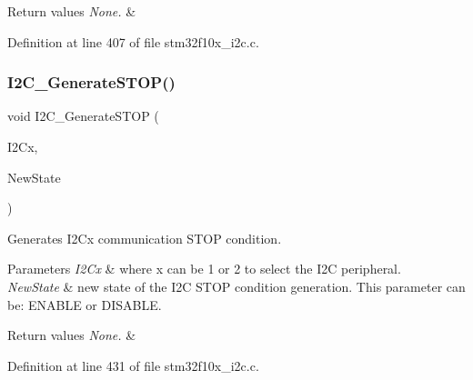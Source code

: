\begin{DoxyRetVals}{Return values}
{\em None.} & \\
\hline
\end{DoxyRetVals}


Definition at line 407 of file stm32f10x\+\_\+i2c.\+c.

\mbox{\label{group___i2_c___exported___functions_ga5c92cb573ca0ae58cc465e5400246561}} 
\subsubsection{\texorpdfstring{I2\+C\+\_\+\+Generate\+S\+T\+O\+P()}{I2C\_GenerateSTOP()}}
{\footnotesize\ttfamily void I2\+C\+\_\+\+Generate\+S\+T\+OP (\begin{DoxyParamCaption}\item[{\hyperlink{struct_i2_c___type_def}{I2\+C\+\_\+\+Type\+Def} $\ast$}]{I2\+Cx,  }\item[{\hyperlink{group___exported__types_gac9a7e9a35d2513ec15c3b537aaa4fba1}{Functional\+State}}]{New\+State }\end{DoxyParamCaption})}



Generates I2\+Cx communication S\+T\+OP condition. 


\begin{DoxyParams}{Parameters}
{\em I2\+Cx} & where x can be 1 or 2 to select the I2C peripheral. \\
\hline
{\em New\+State} & new state of the I2C S\+T\+OP condition generation. This parameter can be\+: E\+N\+A\+B\+LE or D\+I\+S\+A\+B\+LE. \\
\hline
\end{DoxyParams}

\begin{DoxyRetVals}{Return values}
{\em None.} & \\
\hline
\end{DoxyRetVals}


Definition at line 431 of file stm32f10x\+\_\+i2c.\+c.

\mbox{\label{group___i2_c___exported___functions_ga15c95d0ed124f029621a2061b1677ee7}} 
